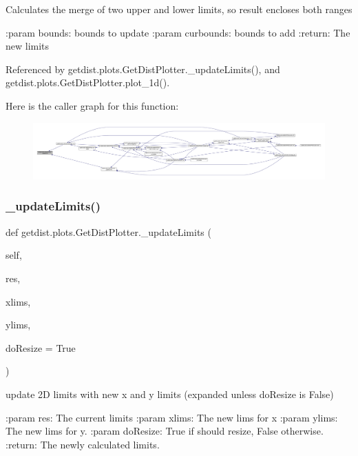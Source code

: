 \begin{DoxyVerb}Calculates the merge of two upper and lower limits, so result encloses both ranges

:param bounds:  bounds to update
:param curbounds:  bounds to add
:return: The new limits
\end{DoxyVerb}
 

Referenced by getdist.\+plots.\+Get\+Dist\+Plotter.\+\_\+update\+Limits(), and getdist.\+plots.\+Get\+Dist\+Plotter.\+plot\+\_\+1d().

Here is the caller graph for this function\+:
\nopagebreak
\begin{figure}[H]
\begin{center}
\leavevmode
\includegraphics[width=350pt]{classgetdist_1_1plots_1_1GetDistPlotter_adc50adc1d2b8ceff5c95ea31a9e886a1_icgraph}
\end{center}
\end{figure}
\mbox{\label{classgetdist_1_1plots_1_1GetDistPlotter_aa39ae5fcf55546a48cc27bc838ca04ff}} 
\subsubsection{\texorpdfstring{\+\_\+update\+Limits()}{\_updateLimits()}}
{\footnotesize\ttfamily def getdist.\+plots.\+Get\+Dist\+Plotter.\+\_\+update\+Limits (\begin{DoxyParamCaption}\item[{}]{self,  }\item[{}]{res,  }\item[{}]{xlims,  }\item[{}]{ylims,  }\item[{}]{do\+Resize = {\ttfamily True} }\end{DoxyParamCaption})\hspace{0.3cm}{\ttfamily [private]}}

\begin{DoxyVerb}update 2D limits with new x and y limits (expanded unless doResize is False)

:param res: The current limits
:param xlims: The new lims for x
:param ylims: The new lims for y.
:param doResize: True if should resize, False otherwise.
:return: The newly calculated limits.
\end{DoxyVerb}
 

